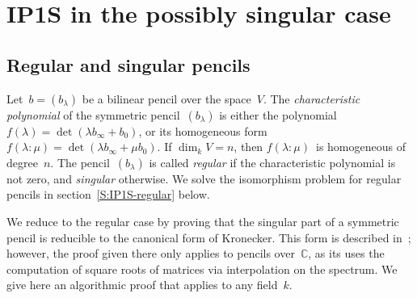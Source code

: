 \documentclass{lms}%
\begin{document}
\section{IP1S in the possibly singular case}%
\label{S:IP1S-singular}
\subsection{Regular and singular pencils}%
Let~$b = (b_{λ})$ be a bilinear pencil over the space~$V$. The
\emph{characteristic polynomial} of the symmetric pencil~$(b_{λ})$ is
either the polynomial~$f(λ) = \det (λ b_{∞} + b_{0})$, or its homogeneous
form~$f(λ: μ) = \det (λ b_{∞} + μ b_{0})$. If $\dim_{k} V = n$, then
$f(λ: μ)$~is homogeneous of degree~$n$. The pencil~$(b_{λ})$ is called
\emph{regular} if the characteristic polynomial is not zero, and
\emph{singular} otherwise. We solve the isomorphism problem for regular
pencils in section~\ref{S:IP1S-regular} below.

We reduce to the regular case by proving that the singular part of a
symmetric pencil is reducible to the canonical form of Kronecker. This
form is described in~\cite[XII(56)]{Gantmacher2}; however, the proof
given there only applies to pencils over~$ℂ$, as its uses the computation
of square roots of matrices via interpolation on the spectrum. We give
here an algorithmic proof that applies to any field~$k$.
\end{document}
